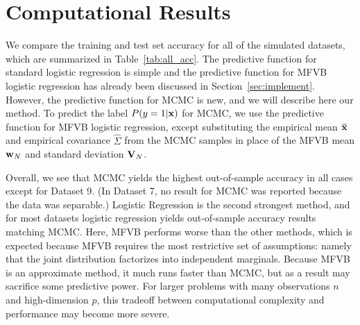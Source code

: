 
\section{Computational Results}\label{sec:comp}

We compare the training and test set accuracy for all of the simulated datasets, which are summarized in Table~\ref{tab:all_acc}.
The predictive function for standard logistic regression is simple and the predictive function for MFVB logistic regression has already been discussed in Section~\ref{sec:implement}.  However, the predictive function for MCMC is new, and we will describe here our method.  To predict the label $P(y=1|\boldsymbol{\mathbf{x}})$ for MCMC, we use the predictive function for MFVB logistic regression, except substituting the empirical mean $\boldsymbol{\mathbf{\bar x}}$ and empirical covariance ${\hat \Sigma}$ from the MCMC samples in place of the MFVB mean $\boldsymbol{\mathbf{w}}_N$ and standard deviation $\boldsymbol{\mathbf{V}}_N$.
 
Overall, we see that MCMC yields the highest out-of-sample accuracy in all cases except for Dataset 9.  (In Dataset 7, no result for
MCMC was reported because the data was separable.)  Logistic Regression is the second strongest method, and for most datasets logistic regression yields out-of-sample accuracy results matching MCMC.  Here, MFVB performs worse than the other methods, which is expected because MFVB requires the most restrictive set of assumptions: namely that the joint distribution factorizes into independent marginals.  Because MFVB is an approximate method, it much runs faster than MCMC, but as a result may sacrifice some predictive power.  For larger problems with many observations $n$ and high-dimension $p$, this tradeoff between computational complexity and performance may become more severe.  




